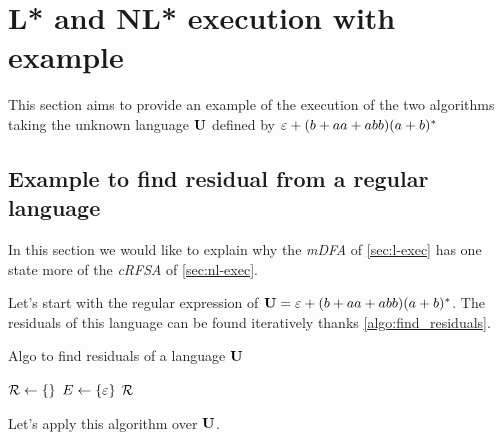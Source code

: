 \section{L* and NL* execution with example}

This section aims to provide an example of the execution of the two algorithms taking the unknown language $\U$ defined by $\varepsilon+(b+aa+abb)(a+b)^*$ %



\subsection{Example to find residual from a regular language}
In this section we would like to explain why the \textit{mDFA} of \cref{sec:l-exec} has one state more of the \textit{cRFSA} of \cref{sec:nl-exec}.

Let's start with the regular expression of $\mathbf{U} = \varepsilon+(b+aa+abb)(a+b)^*$. The residuals of this language can be found iteratively thanks \cref{algo:find_residuals}.


\begin{algorithm}[H]
  \caption{Algo to find residuals of a language $\U$}
  \label{algo:find_residuals}
  \KwIn{$\U$, $\Sigma$}
  $\mathcal{R} \gets \{\}$ 
  $E \gets \{\varepsilon\}$
  \Return $\mathcal{R}$
\end{algorithm}

Let's apply this algorithm over $\U$.

\newcommand{\EM}{\varnothing}

